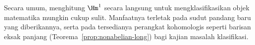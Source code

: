 Secara umum, menghitung $\Hm^1$ secara langsung untuk mengklasifikasikan
objek matematika mungkin cukup sulit. Manfaatnya terletak pada sudut pandang
baru yang diberikannya, serta pada tersedianya perangkat kohomologis seperti
barisan eksak panjang (Teorema~\ref{prop:nonabelian-long}) bagi kajian masalah
klasifikasi.

